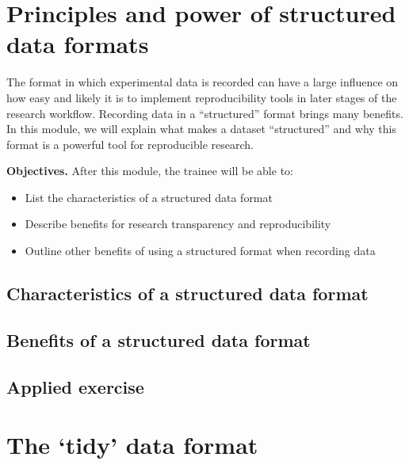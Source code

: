\documentclass[]{tufte-book}
\providecommand{\tightlist}{%
  \setlength{\itemsep}{0pt}\setlength{\parskip}{0pt}}
\begin{document}
\hypertarget{principles-and-power-of-structured-data-formats}{%
\section{Principles and power of structured data formats}\label{principles-and-power-of-structured-data-formats}}

The format in which experimental data is recorded can have a large influence on
how easy and likely it is to implement reproducibility tools in later stages of
the research workflow. Recording data in a ``structured'' format brings many
benefits. In this module, we will explain what makes a dataset ``structured'' and
why this format is a powerful tool for reproducible research.

\textbf{Objectives.} After this module, the trainee will be able to:

\begin{itemize}
\tightlist
\item
  List the characteristics of a structured data format
\item
  Describe benefits for research transparency and reproducibility
\item
  Outline other benefits of using a structured format when recording data
\end{itemize}

\hypertarget{characteristics-of-a-structured-data-format}{%
\subsection{Characteristics of a structured data format}\label{characteristics-of-a-structured-data-format}}

\hypertarget{benefits-of-a-structured-data-format}{%
\subsection{Benefits of a structured data format}\label{benefits-of-a-structured-data-format}}

\hypertarget{applied-exercise}{%
\subsection{Applied exercise}\label{applied-exercise}}

\hypertarget{the-tidy-data-format}{%
\section{The `tidy' data format}\label{the-tidy-data-format}}
\end{document}

